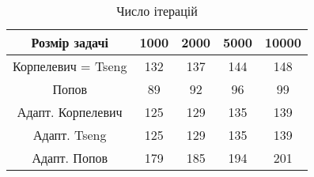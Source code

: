 \begin{table}[H]
	\centering
	\begin{tabular}{|c||c|c|c|c|}\hline
		Розмір задачі & 1000 & 2000 & 5000 & 10000 \\ \hline \hline
		Корпелевич = Tseng & 132 & 137 & 144 & 148 \\ \hline
		Попов & 89 & 92 & 96 & 99 \\ \hline \hline
		Адапт. Корпелевич & 125 & 129 & 135 & 139 \\ \hline
		Адапт. Tseng & 125 & 129 & 135 & 139 \\ \hline
		Адапт. Попов & 179 & 185 & 194 & 201 \\ \hline
	\end{tabular}
	\caption{Число ітерацій}
\end{table}
